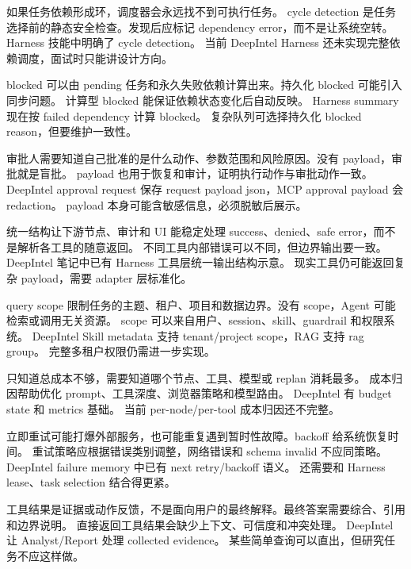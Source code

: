 {如果任务依赖形成环，调度器会永远找不到可执行任务。}
{cycle detection 是任务选择前的静态安全检查。发现后应标记 dependency error，而不是让系统空转。}
{Harness 技能中明确了 cycle detection。}
{当前 DeepIntel Harness 还未实现完整依赖调度，面试时只能讲设计方向。}

{blocked 可以由 pending 任务和永久失败依赖计算出来。持久化 blocked 可能引入同步问题。}
{计算型 blocked 能保证依赖状态变化后自动反映。}
{Harness summary 现在按 failed dependency 计算 blocked。}
{复杂队列可选择持久化 blocked reason，但要维护一致性。}

{审批人需要知道自己批准的是什么动作、参数范围和风险原因。没有 payload，审批就是盲批。}
{payload 也用于恢复和审计，证明执行动作与审批动作一致。}
{DeepIntel approval request 保存 request payload json，MCP approval payload 会 redaction。}
{payload 本身可能含敏感信息，必须脱敏后展示。}

{统一结构让下游节点、审计和 UI 能稳定处理 success、denied、safe error，而不是解析各工具的随意返回。}
{不同工具内部错误可以不同，但边界输出要一致。}
{DeepIntel 笔记中已有 Harness 工具层统一输出结构示意。}
{现实工具仍可能返回复杂 payload，需要 adapter 层标准化。}

{query scope 限制任务的主题、租户、项目和数据边界。没有 scope，Agent 可能检索或调用无关资源。}
{scope 可以来自用户、session、skill、guardrail 和权限系统。}
{DeepIntel Skill metadata 支持 tenant/project scope，RAG 支持 rag group。}
{完整多租户权限仍需进一步实现。}

{只知道总成本不够，需要知道哪个节点、工具、模型或 replan 消耗最多。}
{成本归因帮助优化 prompt、工具深度、浏览器策略和模型路由。}
{DeepIntel 有 budget state 和 metrics 基础。}
{当前 per-node/per-tool 成本归因还不完整。}

{立即重试可能打爆外部服务，也可能重复遇到暂时性故障。backoff 给系统恢复时间。}
{重试策略应根据错误类别调整，网络错误和 schema invalid 不应同策略。}
{DeepIntel failure memory 中已有 next retry/backoff 语义。}
{还需要和 Harness lease、task selection 结合得更紧。}

{工具结果是证据或动作反馈，不是面向用户的最终解释。最终答案需要综合、引用和边界说明。}
{直接返回工具结果会缺少上下文、可信度和冲突处理。}
{DeepIntel 让 Analyst/Report 处理 collected evidence。}
{某些简单查询可以直出，但研究任务不应这样做。}

